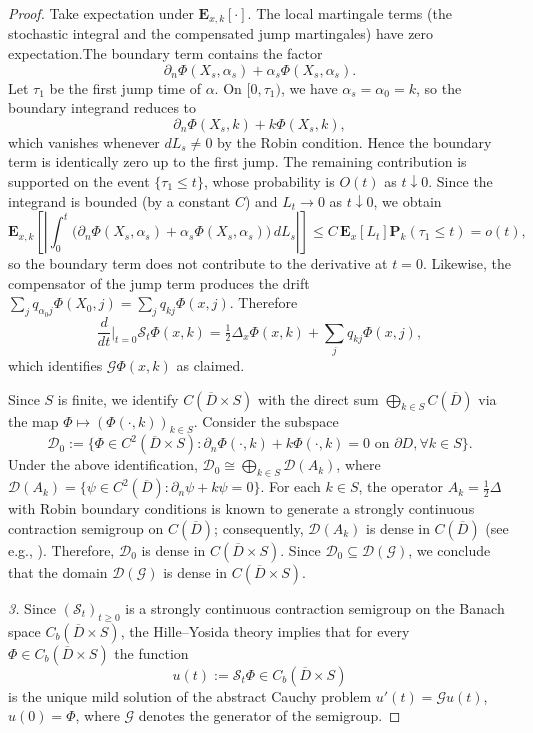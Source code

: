 \documentclass[11pt]{amsart}
\theoremstyle{plain}
\theoremstyle{definition}
\theoremstyle{remark}
\begin{document}
\begin{proof}
	Take expectation under $\mathbf E_{x,k}[\cdot]$. The local martingale terms (the stochastic integral and the compensated jump martingales) have zero expectation.The boundary term contains the factor
	\[
	\partial_n\Phi(X_s,\alpha_s)+\alpha_s\Phi(X_s,\alpha_s).
	\]
	Let \(\tau_1\) be the first jump time of \(\alpha\). On \([0,\tau_1)\), we have
	\(\alpha_s=\alpha_0=k\), so the boundary integrand reduces to
	\[
	\partial_n\Phi(X_s,k)+k\Phi(X_s,k),
	\]
	which vanishes whenever \(dL_s\neq 0\) by the Robin condition. Hence the boundary
	term is identically zero up to the first jump. The remaining contribution is
	supported on the event \(\{\tau_1\le t\}\), whose probability is \(O(t)\) as
	\(t\downarrow 0\). Since the integrand is bounded (by a constant \(C\)) and \(L_t\to 0\) as
	\(t\downarrow 0\), we obtain
	\[
	\mathbf E_{x,k}\left[\left|\int_0^t
	\bigl(\partial_n\Phi(X_s,\alpha_s)+\alpha_s\Phi(X_s,\alpha_s)\bigr)\,dL_s
	\right|\right] \leq C\, \mathbf{E}_x[L_t] \mathbf{P}_k(\tau_1 \leq t)
	=o(t),
	\]
	so the boundary term does not contribute to the derivative at \(t=0\). Likewise, the compensator of the jump term produces the drift $\sum_j q_{\alpha_0 j}\Phi(X_0,j)=\sum_j q_{k j}\Phi(x,j)$. Therefore
	\[
	\frac{d}{dt}\Big|_{t=0}\mathcal S_t\Phi(x,k)
	= \tfrac12\Delta_x\Phi(x,k) + \sum_j q_{k j}\Phi(x,j),
	\]
	which identifies $\mathcal G\Phi(x,k)$ as claimed.
	
	Since $S$ is finite, we identify $C(\overline{D}\times S)$ with the direct sum $\bigoplus_{k\in S} C(\overline{D})$ via the map $\Phi \mapsto (\Phi(\cdot,k))_{k\in S}$. Consider the subspace\[\mathcal{D}_0 := \{ \Phi \in C^2(\overline{D}\times S) : \partial_n \Phi(\cdot,k) + k \Phi(\cdot,k) = 0 \text{ on } \partial D, \forall k \in S \}.
	\]
	Under the above identification, $\mathcal{D}_0 \cong \bigoplus_{k\in S} \mathcal{D}(A_k)$, where $\mathcal{D}(A_k) = \{ \psi \in C^2(\overline{D}) : \partial_n \psi + k \psi = 0 \}$. For each $k \in S$, the operator $A_k = \frac{1}{2}\Delta$ with Robin boundary conditions is known to generate a strongly continuous contraction semigroup on $C(\overline{D})$; consequently, $\mathcal{D}(A_k)$ is dense in $C(\overline{D})$ (see e.g., \cite[Theorem 1.2 and Section 12.4.2]{Taira2004}). Therefore, $\mathcal{D}_0$ is dense in $C(\overline{D}\times S)$. Since $\mathcal{D}_0 \subseteq \mathcal{D}(\mathcal{G})$, we conclude that the domain $\mathcal{D}(\mathcal{G})$ is dense in $C(\overline{D}\times S)$.
	
	\emph{3.} Since $(\mathcal S_t)_{t\ge0}$ is a strongly continuous contraction semigroup on the Banach space $C_b(\overline D\times S)$, the Hille--Yosida theory implies that for every $\Phi\in C_b(\overline D\times S)$ the function
	\[
	u(t):=\mathcal S_t\Phi\in C_b(\overline D\times S)
	\]
	is the unique mild solution of the abstract Cauchy problem $u'(t)=\mathcal G u(t)$, $u(0)=\Phi$, where $\mathcal G$ denotes the generator of the semigroup.
\end{proof}
\end{document}
